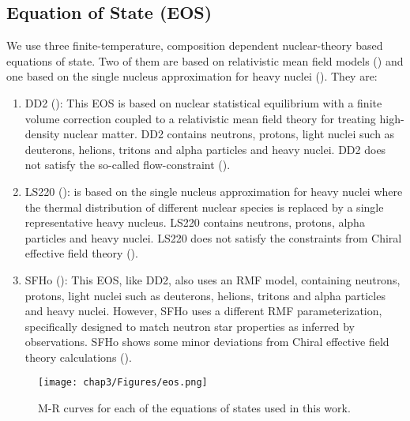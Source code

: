 \subsection{Equation of State (EOS)}

We use three finite-temperature, composition dependent nuclear-theory based equations of state. Two of them are based on relativistic mean field models (\cite{walecka1974theory}) and one based on the single nucleus approximation for heavy nuclei (\cite{lattimer1991generalized}). They are:

\begin{enumerate}
\item{DD2 (\cite{hempel:2011mk}): This EOS is based on nuclear statistical equilibrium with a finite volume correction coupled to a relativistic mean field theory for treating high-density nuclear matter. DD2 contains neutrons, protons, light nuclei such as deuterons, helions, tritons and alpha particles and heavy nuclei. DD2 does not satisfy the so-called flow-constraint (\cite{hempel2017well}).}
\item{
LS220 (\cite{lattimer1991generalized}): is based on the single nucleus approximation
for heavy nuclei where the thermal distribution of different nuclear species is replaced by a single representative heavy nucleus. LS220 contains  neutrons, protons, alpha particles and heavy nuclei. LS220 does not satisfy the constraints from Chiral effective field theory (\cite{hempel2017well}).
}
\item{SFHo (\cite{2013apj...765l...5s}): This EOS, like DD2, also uses an RMF model, containing neutrons, protons, light nuclei such as deuterons, helions, tritons and alpha particles and heavy nuclei. However, SFHo uses a different RMF parameterization,
specifically designed to match neutron star properties as inferred by observations. SFHo shows some minor
deviations from Chiral effective field theory calculations (\cite{hempel2017well}).
}
\end{enumerate}

\begin{figure}[H]
  \centering
  \texttt{[image: chap3/Figures/eos.png]}
\caption{
  M-R curves for each of the equations of states used in this work.
}
\label{fig:eos_mr}
\end{figure}

